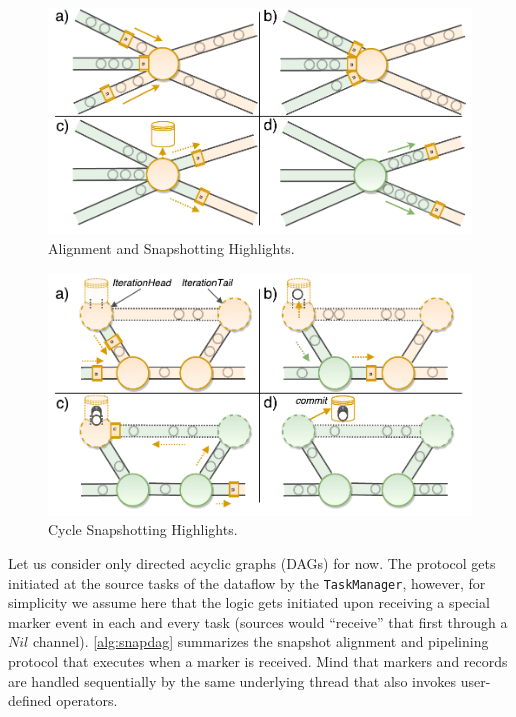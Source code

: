 \begin{figure}[t]
\centering
\includegraphics[width=\textwidth / 2]{figures/snapshots-highlights.pdf}
\caption{Alignment and Snapshotting Highlights.} 
\label{fig:snapshots-highlights}
\vspace{-2mm}
\end{figure}
\begin{figure}[t!]
\centering
\includegraphics[width=\textwidth / 2]{figures/cycle-highlights.pdf}
\caption{Cycle Snapshotting Highlights.} 
\label{fig:cycle-highlights}
\vspace{-2mm}
\end{figure}


Let us consider only directed acyclic graphs (DAGs) for now. The protocol gets initiated at the source tasks of the dataflow by the \texttt{TaskManager}, however, for simplicity we assume here that the logic gets initiated upon receiving a special marker event in each and every task (sources would ``receive'' that first through a $Nil$ channel). \autoref{alg:snapdag} summarizes the snapshot alignment and pipelining protocol that executes when a marker is received. Mind that markers and records are handled sequentially by the same underlying thread that also invokes user-defined operators. 

